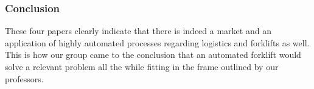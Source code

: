 \documentclass[11pt]{article}
\begin{document}
    \subsubsection{Conclusion}
    These four papers clearly indicate that there is indeed 
    a market and an application of highly automated processes
    regarding logistics and forklifts as well. This is how
    our group came to the conclusion that an automated
    forklift would solve a relevant problem all the while 
    fitting in the frame outlined by our professors. 
\end{document}
